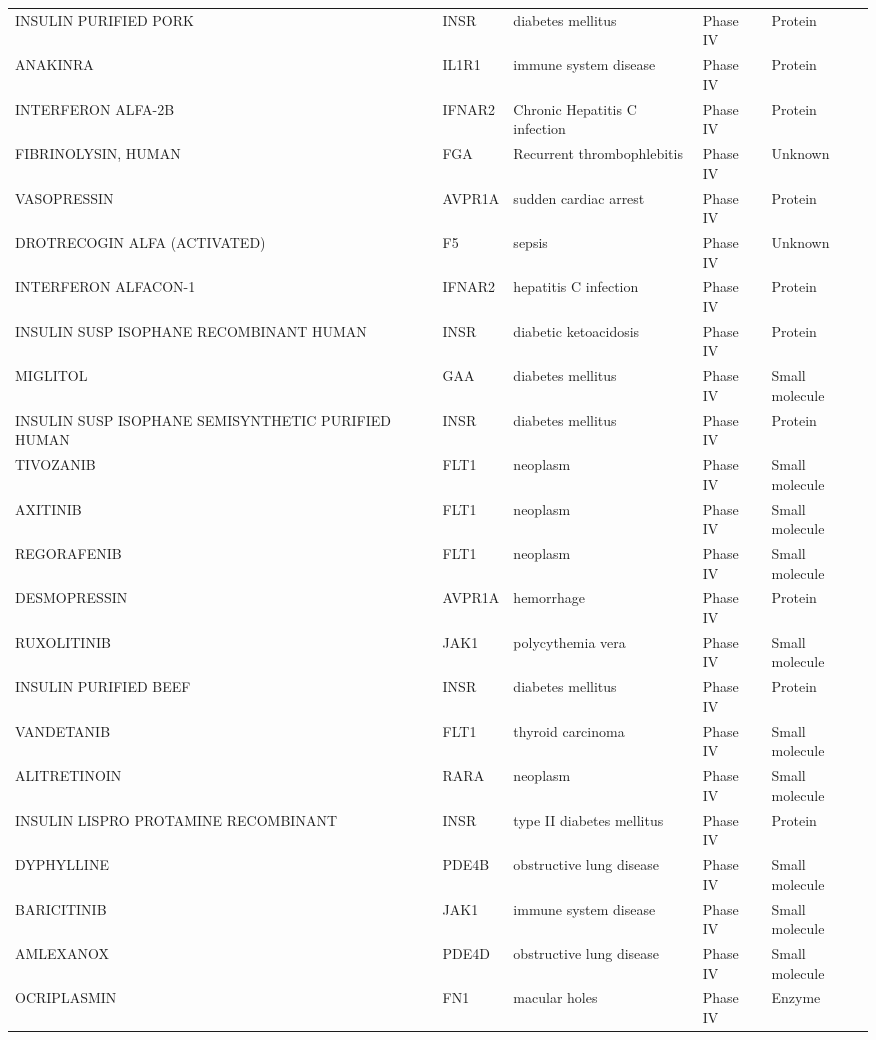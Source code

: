 \documentclass[fleqn,10pt]{SelfArx} %
\begin{document}
\begin{table}[ht]
\begin{tabularx}{\textwidth}{lXlll}
		INSULIN PURIFIED PORK & INSR & diabetes mellitus & Phase IV & Protein \\ 
		ANAKINRA & IL1R1 & immune system disease & Phase IV & Protein \\ 
		INTERFERON ALFA-2B & IFNAR2 & Chronic Hepatitis C infection & Phase IV & Protein \\ 
		FIBRINOLYSIN, HUMAN & FGA & Recurrent thrombophlebitis & Phase IV & Unknown \\ 
		VASOPRESSIN & AVPR1A & sudden cardiac arrest & Phase IV & Protein \\ 
		DROTRECOGIN ALFA (ACTIVATED) & F5 & sepsis & Phase IV & Unknown \\ 
		INTERFERON ALFACON-1 & IFNAR2 & hepatitis C infection & Phase IV & Protein \\ 
		INSULIN SUSP ISOPHANE RECOMBINANT HUMAN & INSR & diabetic ketoacidosis & Phase IV & Protein \\ 
		MIGLITOL & GAA & diabetes mellitus & Phase IV & Small molecule \\ 
		INSULIN SUSP ISOPHANE SEMISYNTHETIC PURIFIED HUMAN & INSR & diabetes mellitus & Phase IV & Protein \\ 
		TIVOZANIB & FLT1 & neoplasm & Phase IV & Small molecule \\ 
		AXITINIB & FLT1 & neoplasm & Phase IV & Small molecule \\ 
		REGORAFENIB & FLT1 & neoplasm & Phase IV & Small molecule \\ 
		DESMOPRESSIN & AVPR1A & hemorrhage & Phase IV & Protein \\ 
		RUXOLITINIB & JAK1 & polycythemia vera & Phase IV & Small molecule \\ 
		INSULIN PURIFIED BEEF & INSR & diabetes mellitus & Phase IV & Protein \\ 
		VANDETANIB & FLT1 & thyroid carcinoma & Phase IV & Small molecule \\ 
		ALITRETINOIN & RARA & neoplasm & Phase IV & Small molecule \\ 
		INSULIN LISPRO PROTAMINE RECOMBINANT & INSR & type II diabetes mellitus & Phase IV & Protein \\ 
		DYPHYLLINE & PDE4B & obstructive lung disease & Phase IV & Small molecule \\ 
		BARICITINIB & JAK1 & immune system disease & Phase IV & Small molecule \\ 
		AMLEXANOX & PDE4D & obstructive lung disease & Phase IV & Small molecule \\ 
		OCRIPLASMIN & FN1 & macular holes & Phase IV & Enzyme \\ 

\end{tabularx}
\end{table}
\end{document}
